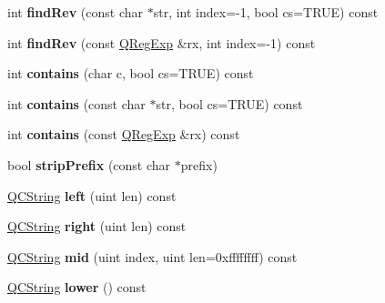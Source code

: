 \begin{DoxyCompactItemize}
int {\bfseries find\+Rev} (const char $\ast$str, int index=-\/1, bool cs=T\+R\+UE) const
\item 
\mbox{\label{class_q_c_string_af9aa6521260dc9cfa6c35453963c0ec0}} 
int {\bfseries find\+Rev} (const \mbox{\hyperlink{class_q_reg_exp}{Q\+Reg\+Exp}} \&rx, int index=-\/1) const
\item 
\mbox{\label{class_q_c_string_aeeedb2810a85c682c2f2a86bcd2355a7}} 
int {\bfseries contains} (char c, bool cs=T\+R\+UE) const
\item 
\mbox{\label{class_q_c_string_ab2617e8fdb6c52fb762a52f7252d61ed}} 
int {\bfseries contains} (const char $\ast$str, bool cs=T\+R\+UE) const
\item 
\mbox{\label{class_q_c_string_a3ac96659cea402b26e7464890f4ef836}} 
int {\bfseries contains} (const \mbox{\hyperlink{class_q_reg_exp}{Q\+Reg\+Exp}} \&rx) const
\item 
\mbox{\label{class_q_c_string_a3524dfec9219699243b6baf0f33bd0f1}} 
bool {\bfseries strip\+Prefix} (const char $\ast$prefix)
\item 
\mbox{\label{class_q_c_string_a8a20d55c0facb1bc0b821ebdfbe55f6d}} 
\mbox{\hyperlink{class_q_c_string}{Q\+C\+String}} {\bfseries left} (uint len) const
\item 
\mbox{\label{class_q_c_string_ad908b11f3f22ad5f7a58675cd7072e7b}} 
\mbox{\hyperlink{class_q_c_string}{Q\+C\+String}} {\bfseries right} (uint len) const
\item 
\mbox{\label{class_q_c_string_ad6cc33bdd4cf4bf4f1c11ddc109ce917}} 
\mbox{\hyperlink{class_q_c_string}{Q\+C\+String}} {\bfseries mid} (uint index, uint len=0xffffffff) const
\item 
\mbox{\label{class_q_c_string_a33688239622e659cfb469fbd62c9cccb}} 
\mbox{\hyperlink{class_q_c_string}{Q\+C\+String}} {\bfseries lower} () const
\item 
\mbox{\label{class_q_c_string_a113ff6fe5b14585eebdcafbf2fe88cc4}} 

\end{DoxyCompactItemize}
